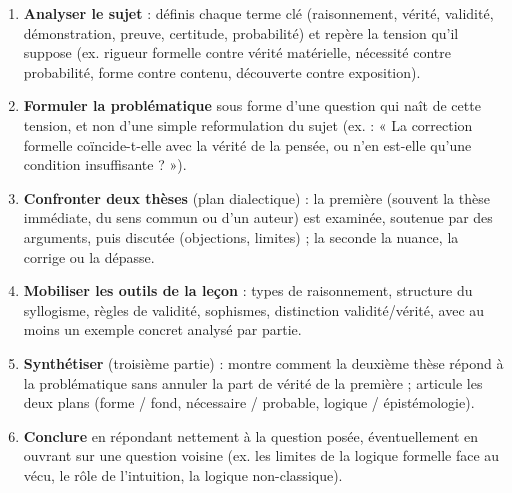 \documentclass[11pt]{article}
\begin{document}
\begin{methode}
\begin{enumerate}
\item \textbf{Analyser le sujet} : définis chaque terme clé (raisonnement, vérité, validité, démonstration, preuve, certitude, probabilité) et repère la tension qu'il suppose (ex. rigueur formelle contre vérité matérielle, nécessité contre probabilité, forme contre contenu, découverte contre exposition).
\item \textbf{Formuler la problématique} sous forme d'une question qui naît de cette tension, et non d'une simple reformulation du sujet (ex. : « La correction formelle coïncide-t-elle avec la vérité de la pensée, ou n'en est-elle qu'une condition insuffisante ? »).
\item \textbf{Confronter deux thèses} (plan dialectique) : la première (souvent la thèse immédiate, du sens commun ou d'un auteur) est examinée, soutenue par des arguments, puis discutée (objections, limites) ; la seconde la nuance, la corrige ou la dépasse.
\item \textbf{Mobiliser les outils de la leçon} : types de raisonnement, structure du syllogisme, règles de validité, sophismes, distinction validité/vérité, avec au moins un exemple concret analysé par partie.
\item \textbf{Synthétiser} (troisième partie) : montre comment la deuxième thèse répond à la problématique sans annuler la part de vérité de la première ; articule les deux plans (forme / fond, nécessaire / probable, logique / épistémologie).
\item \textbf{Conclure} en répondant nettement à la question posée, éventuellement en ouvrant sur une question voisine (ex. les limites de la logique formelle face au vécu, le rôle de l'intuition, la logique non-classique).
\end{enumerate}
\end{methode}
\end{document}
